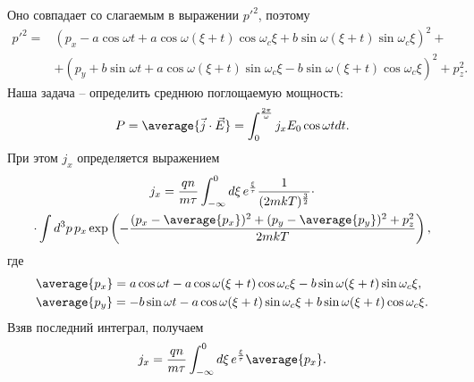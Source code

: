 Оно совпадает со слагаемым в выражении \( {p'}^2 \), поэтому
\begin{align*}
    {p'}^2 = & (p_x - a\cos\omega t + a\cos\omega(\xi+t)\cos\omega_c\xi
    + b\sin\omega(\xi+t)\sin\omega_c\xi)^2 + \\
    & + (p_y + b\sin\omega t + a\cos\omega(\xi+t)\sin\omega_c\xi
    - b\sin\omega(\xi+t)\cos\omega_c\xi)^2 + p_z^2.
\end{align*}
Наша задача -- определить среднюю поглощаемую мощность:
\[
    P = \average{\vec{j}\cdot\vec{E}} =
    \int_0^\frac{2\pi}{\omega} j_x E_0 \cos\omega t dt.
\]
При этом \( j_x \) определяется выражением
\begin{gather*}
    j_x = \frac{qn}{m\tau} \int_{-\infty}^0 d\xi\, e^\frac{\xi}{\tau}
    \frac{1}{(2mkT)^\frac{3}{2}} \cdot \\
    \cdot \int d^3p\, p_x
    \exp\left(-\frac{(p_x - \average{p_x})^2 + (p_y - \average{p_y})^2
    + p_z^2}{2mkT}\right),
\end{gather*}
где
\begin{align*}
    & \average{p_x} = a\cos\omega t - a\cos\omega(\xi+t)\cos\omega_c\xi
    - b\sin\omega(\xi+t)\sin\omega_c\xi, \\
    & \average{p_y} = -b\sin\omega t - a\cos\omega(\xi+t)\sin\omega_c\xi
    + b\sin\omega(\xi+t)\cos\omega_c\xi.
\end{align*}
Взяв последний интеграл, получаем
\[
    j_x = \frac{qn}{m\tau} \int_{-\infty}^0 d\xi\,
    e^\frac{\xi}{\tau}\average{p_x}.
\]

